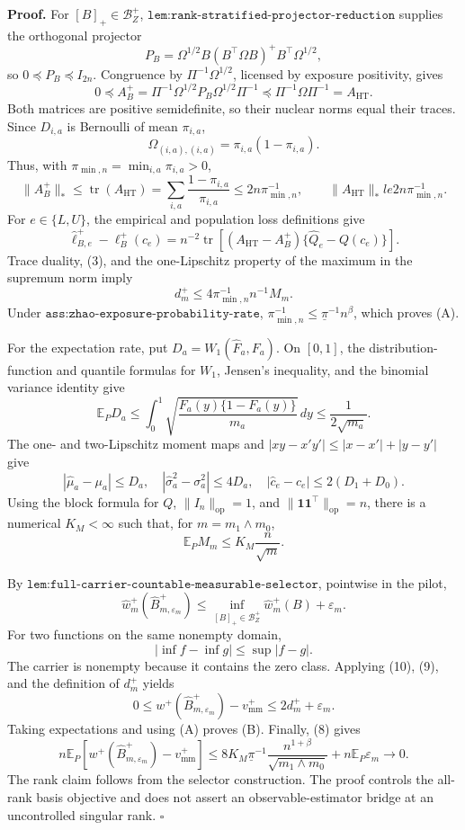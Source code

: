 \textbf{Proof.}
For \([B]_+\in\mathcal B_Z^+\), \(\texttt{lem:rank-stratified-projector-reduction}\) supplies the orthogonal projector
\[
P_B=\Omega^{1/2}B(B^{\top}\Omega B)^+B^{\top}\Omega^{1/2},
\]
so \(0\preceq P_B\preceq I_{2n}\).  Congruence by \(\Pi^{-1}\Omega^{1/2}\), licensed by exposure positivity, gives
\[
0\preceq A_B^+
=\Pi^{-1}\Omega^{1/2}P_B\Omega^{1/2}\Pi^{-1}
\preceq \Pi^{-1}\Omega\Pi^{-1}=A_{\mathrm{HT}}.
\tag{1}
\]
Both matrices are positive semidefinite, so their nuclear norms equal their traces.  Since \(D_{i,a}\) is Bernoulli of mean \(\pi_{i,a}\),
\[
\Omega_{(i,a),(i,a)}=\pi_{i,a}(1-\pi_{i,a}).
\tag{2}
\]
Thus, with \(\pi_{\min,n}=\min_{i,a}\pi_{i,a}>0\),
\[
\lVert A_B^+\rVert_*
\le\operatorname{tr}(A_{\mathrm{HT}})
=\sum_{i,a}\frac{1-\pi_{i,a}}{\pi_{i,a}}
\le2n\pi_{\min,n}^{-1},
\qquad
\lVert A_{\mathrm{HT}}\rVert_*le2n\pi_{\min,n}^{-1}.
\tag{3}
\]
For \(e\in\{L,U\}\), the empirical and population loss definitions give
\[
\widehat\ell_{B,e}^+-\ell_B^+(c_e)
=n^{-2}\operatorname{tr}\!\left[(A_{\mathrm{HT}}-A_B^+)
\{\widehat Q_e-Q(c_e)\}\right].
\tag{4}
\]
Trace duality, (3), and the one-Lipschitz property of the maximum in the supremum norm imply
\[
d_m^+\le4\pi_{\min,n}^{-1}n^{-1}M_m.
\tag{5}
\]
Under \(\texttt{ass:zhao-exposure-probability-rate}\), \(\pi_{\min,n}^{-1}\le\underline\pi^{-1}n^\beta\), which proves (A).

For the expectation rate, put \(D_a=W_1(\widehat F_a,F_a)\).  On \([0,1]\), the distribution-function and quantile formulas for \(W_1\), Jensen's inequality, and the binomial variance identity give
\[
\mathbb E_PD_a
\le\int_0^1\sqrt{\frac{F_a(y)\{1-F_a(y)\}}{m_a}}\,dy
\le\frac1{2\sqrt{m_a}}.
\tag{6}
\]
The one- and two-Lipschitz moment maps and
\(|xy-x'y'|\le|x-x'|+|y-y'|\) give
\[
|\widehat\mu_a-\mu_a|\le D_a,
\quad |\widehat\sigma_a^2-\sigma_a^2|\le4D_a,
\quad |\widehat c_e-c_e|\le2(D_1+D_0).
\tag{7}
\]
Using the block formula for \(Q\), \(\lVert I_n\rVert_{\mathrm{op}}=1\), and \(\lVert\mathbf1\mathbf1^{\top}\rVert_{\mathrm{op}}=n\), there is a numerical \(K_M<\infty\) such that, for \(m=m_1\wedge m_0\),
\[
\mathbb E_PM_m\le K_M\frac n{\sqrt m}.
\tag{8}
\]

By \(\texttt{lem:full-carrier-countable-measurable-selector}\), pointwise in the pilot,
\[
\widehat w_m^+(\widehat B_{m,\varepsilon_m}^+)
\le\inf_{[B]_+\in\mathcal B_Z^+}\widehat w_m^+(B)+\varepsilon_m.
\tag{9}
\]
For two functions on the same nonempty domain,
\[
|\inf f-\inf g|\le\sup|f-g|.
\tag{10}
\]
The carrier is nonempty because it contains the zero class.  Applying (10), (9), and the definition of \(d_m^+\) yields
\[
0\le w^+(\widehat B_{m,\varepsilon_m}^+)-v_{\mathrm{mm}}^+
\le2d_m^++\varepsilon_m.
\tag{11}
\]
Taking expectations and using (A) proves (B).  Finally, (8) gives
\[
n\mathbb E_P\!\left[w^+(\widehat B_{m,\varepsilon_m}^+)-v_{\mathrm{mm}}^+\right]
\le8K_M\underline\pi^{-1}\frac{n^{1+\beta}}{\sqrt{m_1\wedge m_0}}
+n\mathbb E_P\varepsilon_m\longrightarrow0.
\tag{12}
\]
The rank claim follows from the selector construction.  The proof controls the all-rank basis objective and does not assert an observable-estimator bridge at an uncontrolled singular rank. \(\square\)